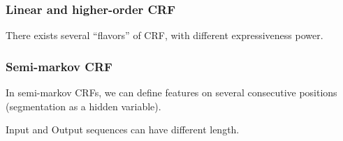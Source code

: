 \documentclass[usenames,dvipsnames]{beamer}
\begin{document}
\begin{frame}\frametitle{Linear and higher-order CRF}
  There exists several ``flavors'' of CRF, with different
  expressiveness power.
\end{frame}

\begin{frame}\frametitle{Semi-markov CRF}
In semi-markov CRFs, we can define features on several consecutive
positions (segmentation as a hidden variable).

Input and Output sequences can have different length.
\end{frame}
\end{document}
